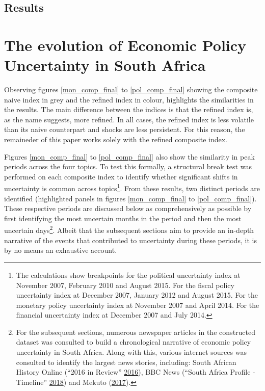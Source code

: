 \documentclass[11pt,preprint, authoryear]{elsarticle}
\numberwithin{equation}{section}
\numberwithin{figure}{section}
\numberwithin{table}{section}
\let\rmarkdownfootnote\footnote%
\def\footnote{\protect\rmarkdownfootnote}
\begin{document}
\subsection{\texorpdfstring{Results
\label{sec_results}}{Results }}\label{results}

\section{\texorpdfstring{The evolution of Economic Policy Uncertainty in
South Africa
\label{sec_discuss}}{The evolution of Economic Policy Uncertainty in South Africa }}\label{the-evolution-of-economic-policy-uncertainty-in-south-africa}

Observing figures \ref{mon_comp_final} to \ref{pol_comp_final} showing
the composite naive index in grey and the refined index in colour,
highlights the similarities in the results. The main difference between
the indices is that the refined index is, as the name suggests, more
refined. In all cases, the refined index is less volatile than its naive
counterpart and shocks are less persistent. For this reason, the
remaineder of this paper works solely with the refined composite index.

Figures \ref{mon_comp_final} to \ref{pol_comp_final} also show the
similarity in peak periods across the four topics. To test this
formally, a structural break test was performed on each composite index
to identify whether significant shifts in uncertainty is common across
topics\footnote{The calculations show breakpoints for the political
  uncertainty index at November 2007, February 2010 and August 2015. For
  the fiscal policy uncertainty index at December 2007, January 2012 and
  August 2015. For the monetary policy uncertainty index at November
  2007 and April 2014. For the financial uncertainty index at December
  2007 and July 2014.}. From these results, two distinct periods are
identified (highlighted panels in figures \ref{mon_comp_final} to
\ref{pol_comp_final}). These respective periods are discussed below as
comprehensively as possible by first identifying the most uncertain
months in the period and then the most uncertain days\footnote{For the
  subsequent sections, numerous newspaper articles in the constructed
  dataset was consulted to build a chronological narrative of economic
  policy uncertainty in South Africa. Along with this, various internet
  sources was consulted to identify the largest news stories, including:
  South African History Online (``2016 in Review''
  \protect\hyperlink{ref-2016}{2016}), BBC News (``South Africa Profile
  - Timeline'' \protect\hyperlink{ref-2018}{2018}) and Mekuto
  (\protect\hyperlink{ref-Mekuto2017}{2017}).}. Albeit that the
subsequent sections aim to provide an in-depth narrative of the events
that contributed to uncertainty during these periods, it is by no means
an exhaustive account.
\end{document}
